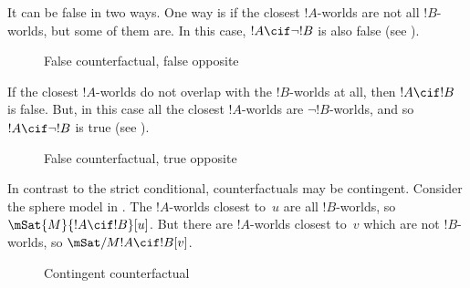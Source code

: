 \documentclass[../../../include/open-logic-section]{subfiles}
\begin{document}
It can be false in two ways. One way is if the closest $!A$-worlds are
not all $!B$-worlds, but some of them are. In this case, $!A \cif
\lnot !B$ is also false (see ).
\begin{figure}
\begin{center}
\caption{False counterfactual, false opposite}
\end{center}
\end{figure}
If the closest $!A$-worlds do not overlap with the $!B$-worlds at all,
then $!A \cif !B$ is false. But, in this case all the closest $!A$-worlds are
$\lnot !B$-worlds, and so $!A \cif \lnot !B$ is true (see
).
\begin{figure}
\begin{center}
\caption{False counterfactual, true opposite}
\end{center}
\end{figure}

In contrast to the strict conditional, counterfactuals may be
contingent. Consider the sphere model in . The
$!A$-worlds closest to~$u$ are all $!B$-worlds, so $\mSat{M}{!A \cif
  !B}[u]$. But there are $!A$-worlds closest to~$v$ which are not
$!B$-worlds, so $\mSat/{M}{!A \cif !B}[v]$.
\begin{figure}
\begin{center}
\end{center}
\caption{Contingent counterfactual}
\end{figure}
\end{document}
